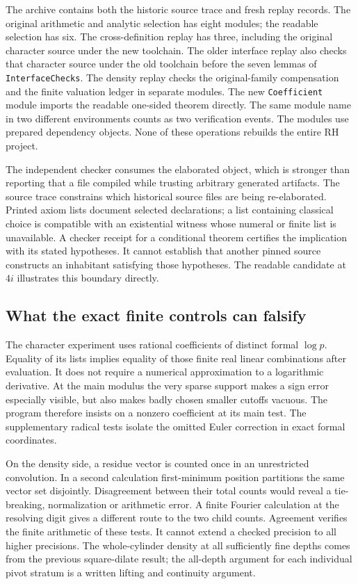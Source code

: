 \documentclass[12pt,letterpaper]{article}
\newcommand{\id}[1]{{\small\nolinkurl{#1}}}
\begin{document}
The archive contains both the historic source trace and fresh replay records. The original arithmetic and analytic selection has eight modules; the readable selection has six. The cross-definition replay has three, including the original character source under the new toolchain. The older interface replay also checks that character source under the old toolchain before the seven lemmas of \id{InterfaceChecks}. The density replay checks the original-family compensation and the finite valuation ledger in separate modules. The new \id{Coefficient} module imports the readable one-sided theorem directly. The same module name in two different environments counts as two verification events. The modules use prepared dependency objects. None of these operations rebuilds the entire RH project.

The independent checker consumes the elaborated object, which is stronger than reporting that a file compiled while trusting arbitrary generated artifacts. The source trace constrains which historical source files are being re-elaborated. Printed axiom lists document selected declarations; a list containing classical choice is compatible with an existential witness whose numeral or finite list is unavailable. A checker receipt for a conditional theorem certifies the implication with its stated hypotheses. It cannot establish that another pinned source constructs an inhabitant satisfying those hypotheses. The readable candidate at $4i$ illustrates this boundary directly.

\subsection{What the exact finite controls can falsify}
The character experiment uses rational coefficients of distinct formal $\log p$. Equality of its lists implies equality of those finite real linear combinations after evaluation. It does not require a numerical approximation to a logarithmic derivative. At the main modulus the very sparse support makes a sign error especially visible, but also makes badly chosen smaller cutoffs vacuous. The program therefore insists on a nonzero coefficient at its main test. The supplementary radical tests isolate the omitted Euler correction in exact formal coordinates.

On the density side, a residue vector is counted once in an unrestricted convolution. In a second calculation first-minimum position partitions the same vector set disjointly. Disagreement between their total counts would reveal a tie-breaking, normalization or arithmetic error. A finite Fourier calculation at the resolving digit gives a different route to the two child counts. Agreement verifies the finite arithmetic of these tests. It cannot extend a checked precision to all higher precisions. The whole-cylinder density at all sufficiently fine depths comes from the previous square-dilate result; the all-depth argument for each individual pivot stratum is a written lifting and continuity argument.
\end{document}
